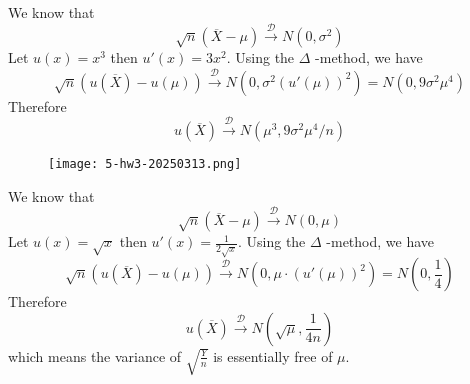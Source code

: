 We know that
\[
\sqrt{ n }(\overline{X}-\mu)\overset{ \mathcal{D} }{ \to }N(0,\sigma^{2})
\]
Let $u(x)=x^{3}$ then $u'(x)=3x^{2}$. Using the $\Delta$ -method, we have
\[
\sqrt{ n }(u(\overline{X})-u(\mu))\overset{ \mathcal{D} }{ \to }N(0,\sigma^{2}(u'(\mu))^{2})=N(0,9\sigma^{2}\mu^{4})
\]
Therefore
\[
u(\overline{X})\overset{ \mathcal{D} }{ \to }N(\mu^{3},9\sigma^{2}\mu^{4}/n)
\]
\begin{figure}[H]
\centering
\texttt{[image: 5-hw3-20250313.png]}
\label{}
\end{figure}

We know that
\[
\sqrt{ n }(\overline{X}-\mu)\overset{ \mathcal{D} }{ \to }N(0,\mu)
\]
Let $u(x)=\sqrt{ x }$ then $u'(x)=\frac{1}{2\sqrt{ x }}$. Using the $\Delta$ -method, we have
\[
\sqrt{ n }(u(\overline{X})-u(\mu))\overset{ \mathcal{D} }{ \to }N(0,\mu \cdot(u'(\mu))^{2})=N\left( 0,\frac{1}{4} \right)
\]
Therefore
\[
u(\overline{X})\overset{ \mathcal{D} }{ \to }N\left( \sqrt{ \mu },\frac{1}{4n}  \right)
\]
which means the variance of $\sqrt{ \frac{Y}{n} }$ is essentially free of $\mu$.
